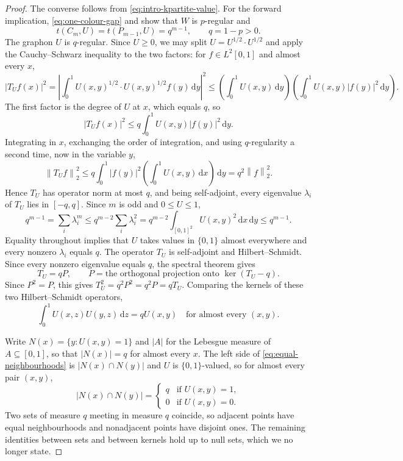 \documentclass[11pt]{article}
\numberwithin{equation}{section}
\newcommand{\norm}[1]{\left\lVert #1\right\rVert}
\newcommand{\dd}{\,\mathrm d}
\newcommand{\tC}[2]{t(C_{#1},#2)}
\newcommand{\tP}[2]{t(P_{#1},#2)}
\newcommand{\Tker}[1]{T_{#1}}
\newcommand{\intsq}{\int_{[0,1]^2}}
\newcommand{\ddxy}{\dd x\dd y}
\begin{document}
\begin{proof}
  The converse follows from \eqref{eq:intro-kpartite-value}.
  For the forward implication, \eqref{eq:one-colour-gap} and  show that $W$ is $p$-regular and
  \[
    \tC mU=\tP{m-1}U=q^{m-1},\qquad q=1-p>0.
  \]
  The graphon $U$ is $q$-regular.
  Since $U\ge0$, we may split $U=U^{1/2}\cdot U^{1/2}$ and apply the Cauchy--Schwarz
  inequality to the two factors: for $f\in L^2[0,1]$ and almost every $x$,
  \[
    \bigl|\Tker Uf(x)\bigr|^2
    =\left|\int_0^1 U(x,y)^{1/2}\cdot U(x,y)^{1/2}f(y)\dd y\right|^2
    \le\left(\int_0^1 U(x,y)\dd y\right)
      \left(\int_0^1 U(x,y)\bigl|f(y)\bigr|^2\dd y\right).
  \]
  The first factor is the degree of $U$ at $x$, which equals $q$, so
  \[
    \bigl|\Tker Uf(x)\bigr|^2\le q\int_0^1 U(x,y)\bigl|f(y)\bigr|^2\dd y .
  \]
  Integrating in $x$, exchanging the order of integration, and using $q$-regularity a
  second time, now in the variable $y$,
  \[
    \norm{\Tker Uf}_2^2
    \le q\int_0^1\bigl|f(y)\bigr|^2
      \left(\int_0^1 U(x,y)\dd x\right)\dd y
    =q^2\norm f_2^2 .
  \]
  Hence $\Tker U$ has operator norm at most $q$, and being self-adjoint, every
  eigenvalue $\lambda_i$ of $\Tker U$ lies in $[-q,q]$.
  Since $m$ is odd and $0\le U\le1$,
  \begin{equation}\label{eq:regular-complement-cycle}
    q^{m-1}=\sum_i\lambda_i^m
    \le q^{m-2}\sum_i\lambda_i^2
    =q^{m-2}\intsq U(x,y)^2\ddxy
    \le q^{m-1}.
  \end{equation}
  Equality throughout implies that $U$ takes values in $\{0,1\}$ almost everywhere and every nonzero $\lambda_i$ equals $q$.
  The operator $\Tker U$ is self-adjoint and Hilbert--Schmidt.
  Since every nonzero eigenvalue equals $q$, the spectral theorem gives
  \[
    \Tker U=qP,
    \qquad P=\text{the orthogonal projection onto }\ker(\Tker U-q).
  \]
  Since $P^2=P$, this gives $\Tker U^2=q^2P^2=q^2P=q\Tker U$.
  Comparing the kernels of these two Hilbert--Schmidt operators,
  \begin{equation}\label{eq:equal-neighbourhoods}
    \int_0^1 U(x,z)U(y,z)\dd z=qU(x,y)
    \quad\text{for almost every }(x,y).
  \end{equation}

  Write $N(x)=\{y:U(x,y)=1\}$ and $|A|$ for the Lebesgue measure of $A\subseteq[0,1]$, so that $|N(x)|=q$ for almost every $x$.
  The left side of \eqref{eq:equal-neighbourhoods} is $|N(x)\cap N(y)|$ and $U$ is $\{0,1\}$-valued, so for almost every pair $(x,y)$,
  \[
    \bigl|N(x)\cap N(y)\bigr|
    =\begin{cases}
      q&\text{if }U(x,y)=1,\\
      0&\text{if }U(x,y)=0.
    \end{cases}
  \]
  Two sets of measure $q$ meeting in measure $q$ coincide, so adjacent points have equal neighbourhoods and nonadjacent points have disjoint ones.
  The remaining identities between sets and between kernels hold up to null sets, which we no longer state.


\end{proof}
\end{document}
